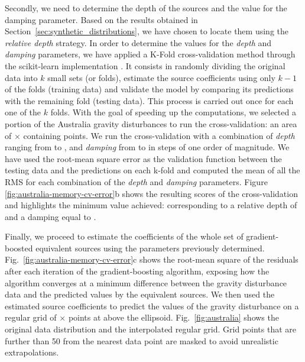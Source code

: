 Secondly, we need to determine the depth of the sources and the value for the
damping parameter. Based on the results obtained in
Section~\ref{sec:synthetic_distributions}, we have chosen to locate them using
the \emph{relative depth} strategy.
In order to determine the values for the \emph{depth} and \emph{damping}
parameters, we have applied a K-Fold cross-validation method through the
scikit-learn implementation \citep{sklearn2011}.
It consists in randomly dividing the original data into $k$ small sets (or
folds), estimate the source coefficients using only $k - 1$ of the folds
(training data) and validate the model by comparing its predictions with the
remaining fold (testing data). This process is carried out once for each one of
the $k$ folds.
With the goal of speeding up the computations, we selected a portion of the
Australia gravity disturbances to run the cross-validation: an area of
\AustraliaSmallAreaEastingSize{}$\times$\AustraliaSmallAreaNorthingSize{}
containing \AustraliaSmallAreaNPoints{} points.
We run the cross-validation with a combination of \emph{depth} ranging from
\AustraliaDepthMin{} to \AustraliaDepthMax{},
and \emph{damping} from
\AustraliaDampingMin{} to \AustraliaDampingMax{} in steps of one order of
magnitude.
We have used the root-mean square error as the validation function between the
testing data and the predictions on each k-fold and computed the mean of all
the RMS for each combination of the \emph{depth} and \emph{damping} parameters.
Figure \ref{fig:australia-memory-cv-error}b shows the resulting scores of the
cross-validation and highlights the minimum value achieved:
\AustraliaEqlRmsScore{} corresponding to a relative depth of \AustraliaEqlDepth{} and
a damping equal to \AustraliaEqlDamping{}.

Finally, we proceed to estimate the coefficients of the whole set of
gradient-boosted equivalent sources using the parameters previously determined.
Fig.~\ref{fig:australia-memory-cv-error}c shows the root-mean square of the
residuals after each iteration of the gradient-boosting algorithm, exposing how
the algorithm converges at a minimum difference between the gravity disturbance
data and the predicted values by the equivalent sources.
We then used the estimated source coefficients to predict the values of the
gravity disturbance on a regular grid of
\AustraliaEqlGridNLongitude{}$\times$\AustraliaEqlGridNLatitude{} points at
\AustraliaEqlGridHeight{} above the ellipsoid.
Fig.~\ref{fig:australia} shows the original data distribution and the
interpolated regular grid.
Grid points that are further than 50\km{} from the nearest data
point are masked to avoid unrealistic extrapolations.

